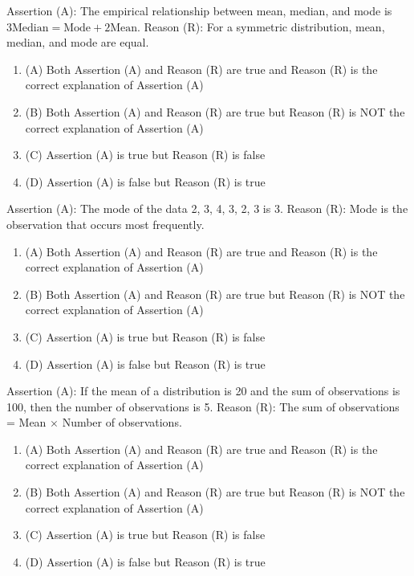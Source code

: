 \documentclass[12pt,a4paper]{exam}
\begin{document}
\begin{questions}
\question[1] Assertion (A): The empirical relationship between mean, median, and mode is $3 \text{Median} = \text{Mode} + 2 \text{Mean}$. Reason (R): For a symmetric distribution, mean, median, and mode are equal.
\begin{enumerate}[label=(\Alph*)]
  \item (A) Both Assertion (A) and Reason (R) are true and Reason (R) is the correct explanation of Assertion (A)
  \item (B) Both Assertion (A) and Reason (R) are true but Reason (R) is NOT the correct explanation of Assertion (A)
  \item (C) Assertion (A) is true but Reason (R) is false
  \item (D) Assertion (A) is false but Reason (R) is true
\end{enumerate}
\vspace{0.15cm}

\question[1] Assertion (A): The mode of the data 2, 3, 4, 3, 2, 3 is 3. Reason (R): Mode is the observation that occurs most frequently.
\begin{enumerate}[label=(\Alph*)]
  \item (A) Both Assertion (A) and Reason (R) are true and Reason (R) is the correct explanation of Assertion (A)
  \item (B) Both Assertion (A) and Reason (R) are true but Reason (R) is NOT the correct explanation of Assertion (A)
  \item (C) Assertion (A) is true but Reason (R) is false
  \item (D) Assertion (A) is false but Reason (R) is true
\end{enumerate}
\vspace{0.15cm}

\question[1] Assertion (A): If the mean of a distribution is 20 and the sum of observations is 100, then the number of observations is 5. Reason (R): The sum of observations = Mean $\times$ Number of observations.
\begin{enumerate}[label=(\Alph*)]
  \item (A) Both Assertion (A) and Reason (R) are true and Reason (R) is the correct explanation of Assertion (A)
  \item (B) Both Assertion (A) and Reason (R) are true but Reason (R) is NOT the correct explanation of Assertion (A)
  \item (C) Assertion (A) is true but Reason (R) is false
  \item (D) Assertion (A) is false but Reason (R) is true
\end{enumerate}
\vspace{0.15cm}


\end{questions}
\end{document}
